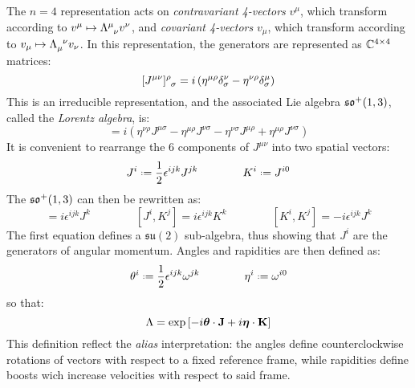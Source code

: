 The $ n = 4 $ representation acts on \textit{contravariant 4-vectors} $ v^\mu $, which transform according to $ v^\mu \mapsto \tensor{\Lambda}{^\mu_\nu} v^\nu $, and \textit{covariant 4-vectors} $ v_\mu $, which transform according to $ v_\mu \mapsto \tensor{\Lambda}{_\mu^\nu} v_\nu $. In this representation, the generators are represented as $ \mathbb{C}^{4 \times 4} $ matrices:
\begin{equation}
  \tensor{[J^{\mu \nu}]}{^\rho_\sigma} = i \left( \eta^{\mu \rho} \delta^\nu_\sigma - \eta^{\nu \rho} \delta^\mu_\sigma \right)
  \label{eq:1.31}
\end{equation}
This is an irreducible representation, and the associated Lie algebra $ \mathfrak{so}^+(1,3) $, called the \textit{Lorentz algebra}, is:
\begin{equation}
  [J^{\mu \nu}, J^{\sigma \rho}] = i \left( \eta^{\nu \rho} J^{\mu \sigma} - \eta^{\mu \rho} J^{\nu \sigma} - \eta^{\nu \sigma} J^{\mu \rho} + \eta^{\mu \rho} J^{\nu \sigma} \right)
  \label{eq:1.32}
\end{equation}
It is convenient to rearrange the 6 components of $ J^{\mu \nu} $ into two spatial vectors:
\begin{equation}
  J^i \defeq \frac{1}{2} \epsilon^{ijk} J^{jk}
  \qquad \qquad
  K^i \defeq J^{i0}
  \label{eq:1.33}
\end{equation}
The $ \mathfrak{so}^+(1,3) $ can then be rewritten as:
\begin{equation}
  [J^i, J^j] = i \epsilon^{ijk} J^k
  \qquad \qquad
  [J^i, K^j] = i \epsilon^{ijk} K^k
  \qquad \qquad
  [K^i, K^j] = - i \epsilon^{ijk} J^k
  \label{eq:1.34}
\end{equation}
The first equation defines a $ \mathfrak{su}(2) $ sub-algebra, thus showing that $ J^i $ are the generators of angular momentum. Angles and rapidities are then defined as:
\begin{equation}
  \theta^i \defeq \frac{1}{2} \epsilon^{ijk} \omega^{jk}
  \qquad \qquad
  \eta^i \defeq \omega^{i0}
  \label{eq:1.35}
\end{equation}
so that:
\begin{equation}
  \Lambda = \exp \left[ -i \boldsymbol{\theta} \cdot \mathbf{J} + i \boldsymbol{\eta} \cdot \mathbf{K} \right]
  \label{eq:1.36}
\end{equation}
This definition reflect the \textit{alias} interpretation: the angles define counterclockwise rotations of vectors with respect to a fixed reference frame, while rapidities define boosts wich increase velocities with respect to said frame.

